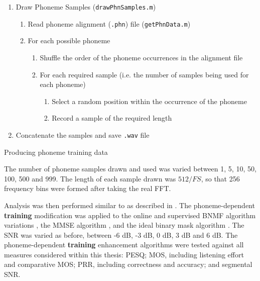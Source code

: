 \begin{algorithm}[H]
\begin{enumerate}
\item Draw Phoneme Samples (\lstinline!drawPhnSamples.m!)

\begin{enumerate}
\item Read phoneme alignment (\lstinline!.phn!) file (\lstinline!getPhnData.m!)
\item For each possible phoneme

\begin{enumerate}
\item Shuffle the order of the phoneme occurrences in the alignment file
\item For each required sample (i.e. the number of samples being used for
each phoneme)

\begin{enumerate}
\item Select a random position within the occurrence of the phoneme
\item Record a sample of the required length
\end{enumerate}
\end{enumerate}
\end{enumerate}
\item Concatenate the samples and save \lstinline!.wav! file
\end{enumerate}
\protect\caption{\label{alg:Producing-phoneme-training}Producing phoneme training
data}


\end{algorithm}


The number of phoneme samples drawn and used was varied between 1,
5, 10, 50, 100, 500 and 999. The length of each sample drawn was $512/FS$,
so that 256 frequency bins were formed after taking the real \ac{FFT}.

Analysis was then performed similar to as described in .
The phoneme-dependent \textbf{training} modification was applied to
the online and supervised \ac{BNMF} algorithm variations \citep{mohammadiha2013supervised},
the \ac{MMSE} algorithm \citep{Brookes1997}, and the ideal binary
mask algorithm \citep{Wojcicki2011}. The \ac{SNR} was varied as
before, between -6 dB, -3 dB, 0 dB, 3 dB and 6 dB. The phoneme-dependent\textbf{
training} enhancement algorithms were tested against all measures
considered within this thesis: \ac{PESQ}; \ac{MOS}, including listening
effort and comparative \ac{MOS}; \ac{PRR}, including correctness
and accuracy; and segmental \ac{SNR}.


